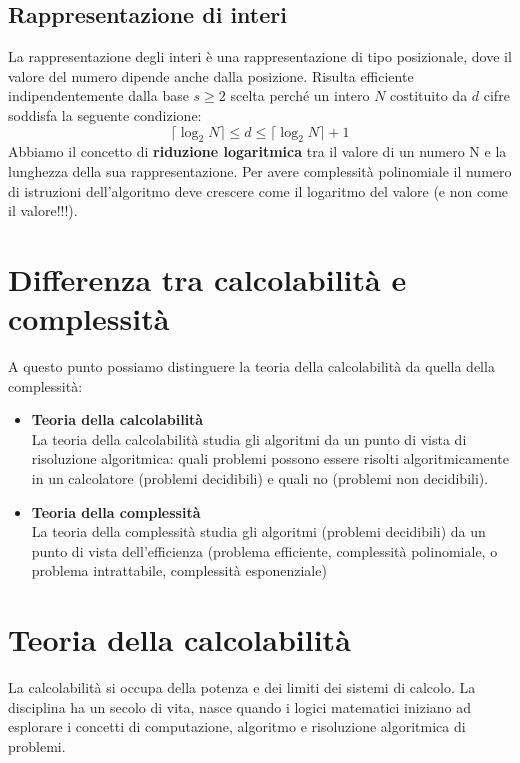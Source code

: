 \subsection{Rappresentazione di interi}
La rappresentazione degli interi è una rappresentazione di tipo posizionale, dove il valore del numero dipende anche dalla posizione. Risulta efficiente  indipendentemente dalla base $s \geq 2$ scelta perché un intero $N$ costituito da $d$ cifre soddisfa la seguente condizione: \[\lceil \log_{2}N \rceil \leq d \leq \lceil \log_{2}N \rceil + 1\]
Abbiamo il concetto di \textbf{riduzione logaritmica} tra il valore di un numero N e la lunghezza della sua rappresentazione. Per avere complessità polinomiale il numero di istruzioni dell’algoritmo deve crescere come il logaritmo del valore (e non come il valore!!!).
\section{Differenza tra calcolabilità e complessità}
A questo punto possiamo distinguere la teoria della calcolabilità da quella della complessità:
\begin{itemize}
	\item \textbf{Teoria della calcolabilità}\\La teoria della calcolabilità studia gli algoritmi da un punto di vista di risoluzione algoritmica: quali problemi possono essere risolti algoritmicamente in un calcolatore (problemi decidibili) e quali no (problemi non decidibili).
	\item \textbf{Teoria della complessità}\\La teoria della complessità studia gli algoritmi (problemi decidibili) da un punto di vista dell’efficienza (problema efficiente, complessità polinomiale, o problema intrattabile, complessità esponenziale)
\end{itemize}

\section{Teoria della calcolabilità}
La calcolabilità si occupa della potenza e dei limiti dei sistemi di calcolo. La disciplina ha un secolo di vita, nasce quando i logici matematici iniziano ad esplorare i concetti di computazione, algoritmo e risoluzione algoritmica di problemi. 
